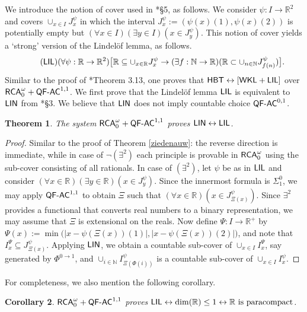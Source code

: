 \documentclass[reqno]{amsart}
\newtheorem{thm}{Theorem}
\newtheorem{cor}[thm]{Corollary}
\newcommand\be{\begin{equation}}
\newcommand\ee{\end{equation}}
\def\RCA{\textup{\textsf{RCA}}}
\def\RCAo{\textup{\textsf{RCA}}_{0}^{\omega}}
\def\WKL{\textup{\textsf{WKL}}}
\def\N{{\mathbb  N}}
\def\R{{\mathbb  R}}
\def\di{\rightarrow}
\def\asa{\leftrightarrow}
\def\QFAC{\textup{\textsf{QF-AC}}}
\def\HBT{\textup{\textsf{HBT}}}
\def\LIN{\textup{\textsf{LIN}}}
\def\LIL{\textup{\textsf{LIL}}}
\numberwithin{equation}{section}
\numberwithin{thm}{section}
\begin{document}
We introduce the notion of cover used in \cite{dagsamV}*{\S5}, as follows.
We consider $\psi:I\di \R^{2}$ and covers $\cup_{x\in I}J_{x}^{\psi}$ in which the interval $J_{x}^{\psi}:=(\psi(x)(1), \psi(x)(2))$ is potentially empty but $(\forall x\in I)(\exists y\in I)(x\in J_{y}^{\psi})$. 
This notion of cover yields a `strong' version of the Lindel\"of lemma, as follows.  %
\be\tag{$\LIL$}
(\forall \psi:\R\di \R^{2})\big[ \R\subseteq \cup_{x\in \R}J_{x}^{\psi}\di   (\exists f:\N\di \R)(\R\subset \cup_{n\in \N}J_{f(n)}^{\psi}) \big].
\ee
Similar to the proof of \cite{dagsamIII}*{Theorem 3.13}, one proves that $\HBT\asa [\WKL+\LIL]$ over $\RCAo+\QFAC^{1,1}$.
We first prove that the Lindel\"of lemma $\LIL$ is equivalent to $\LIN$ from \cite{dagsamIII}*{\S3}. %
We believe that $\LIN$ does not imply countable choice $\QFAC^{0,1}$. 
\begin{thm}\label{brokken}
The system $\RCA_{0}^{\omega}+\QFAC^{1,1}$ proves $\LIN\asa \LIL$.
\end{thm}
\begin{proof}
Similar to the proof of Theorem \ref{ziedenauw}: the reverse direction is immediate, while in case of $\neg(\exists^{2})$ each principle is provable in $\RCAo$ using the sub-cover consisting of all rationals.
In case of $(\exists^{2})$, let $\psi$ be as in $\LIL$ and consider $(\forall x\in \R)(\exists y\in \R)(x\in J_{y}^{\psi})$.  Since the innermost formula is $\Sigma_{1}^{0}$, we may 
apply $\QFAC^{1,1}$ to obtain $\Xi$ such that $(\forall x\in \R)(x\in J_{\Xi(x)}^{\psi})$.  Since $\exists^{2}$ provides a functional that converts real numbers to a binary representation, we may assume that $\Xi$ is extensional on the reals.   
Now define $\Psi:I\di \R^{+}$ by $\Psi(x):=\min\big(|x-\psi(\Xi(x))(1)|, |x-\psi(\Xi(x))(2)|\big)$, and note that $I^{\Psi}_{x}\subseteq J_{\Xi(x)}^{\psi}$.  
Applying $\LIN$, we obtain a countable sub-cover of $\cup_{x\in I}I_{x}^{\Psi}$, say generated by $\Phi^{0\di1} $, and $\cup_{i\in \N}I_{\Xi(\Phi(i))}^{\psi}$ is a countable sub-cover of $\cup_{x\in I}I_{x}^{\psi}$.
\end{proof}
For completeness, we also mention the following corollary.  %
\begin{cor}
$\RCAo+\QFAC^{1,1}$ proves $ \LIL\asa \dim(\R)\leq 1\asa \textup{$\R$ is paracompact}$.  
\end{cor}
\end{document}
